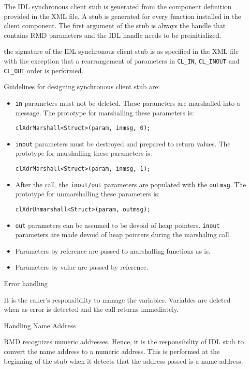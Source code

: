 \begin{flushleft}
The IDL synchronous client stub is generated from the component definition provided in the XML file. A stub is generated for every function installed in the
client component. 
The first argument of the stub is always the handle that contains RMD parameters and the IDL handle needs to be preinitialized. \par
the signature of the IDL synchronous client stub is as specified in the XML file with the exception that a rearrangement of parameters in {\tt{CL\_\-IN}}, {\tt{CL\_\-INOUT}} and 
{\tt{CL\_\-OUT}} order is performed.\par
Guidelines for designing synchronous client stub are:
\begin{itemize}
\item
{\tt{in}} parameters must not be deleted. These parameters are marshalled into a message. The prototype for marshalling these parameters is:\par
{\tt{clXdrMarshall<Struct>(param, inmsg, 0);}}
\item
{\tt{inout}} parameters must be destroyed and prepared to return values. The prototype for marshalling these parameters is:\par
{\tt{clXdrMarshall<Struct>(param, inmsg, 1);}}
\item
After the call, the {\tt{inout/out}} parameters are populated with the {\tt{outmsg}}. The prototype for unmarshalling these parameters is:\par
{\tt{clXdrUnmarshall<Struct>(param, outmsg);}}
\item
{\tt{out}} parameters can be assumed to be devoid of heap pointers. {\tt{inout}} parameters are made devoid of heap pointers during the marshaling call.
\item
Parameters by reference are passed to marshalling functions as is.
\item
Parameters by value are passed by reference.
\end{itemize}

\begin{Desc}
\item
[Error handling]
\end{Desc}
It is the caller's responsibility to manage the variables. Variables are deleted when as error is detected and the call returns immediately.

\begin{Desc}
\item
[Handling Name Address]
\end{Desc}

RMD recognizes numeric addresses. Hence, it is the responsibility of IDL stub to convert the name address to  a numeric address. This is performed at 
the beginning of the stub when it detects that the address passed is a name address.


\end{flushleft}
